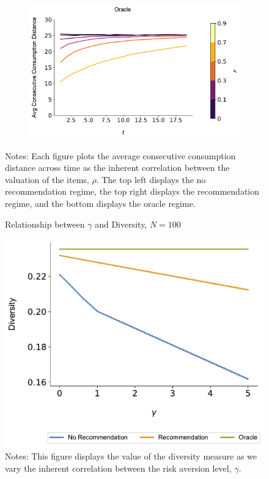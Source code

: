 \documentclass[format=acmsmall, review=true]{acmart}
\begin{document}
\begin{figure}[H]
\begin{subfigure}{.45\textwidth}
\end{subfigure}\\
\begin{subfigure}{.45\textwidth}
\includegraphics[width=\linewidth]{figures/rho_consumption_dist_N_100T_20_omni.pdf}\\
\end{subfigure}
\caption*{\scriptsize Notes: Each figure plots the average consecutive consumption distance across time as the inherent correlation between the valuation of the items, $\rho$. The top left displays the no recommendation regime, the top right displays the recommendation regime, and the bottom displays the oracle regime.}
\label{fig:local_consumption_across_rho}
\end{figure}

\begin{figure}[ht]
\caption{Relationship between $\gamma$ and Diversity, $N = 100$}
\includegraphics[width=.45\linewidth]{figures/gamma_diversity_N_100_T_20}
\caption*{\scriptsize Notes: This figure displays the value of the diversity measure as we vary the inherent correlation between the risk aversion level, $\gamma$.}\label{fig:cor_homo}
\end{figure}
\end{document}

